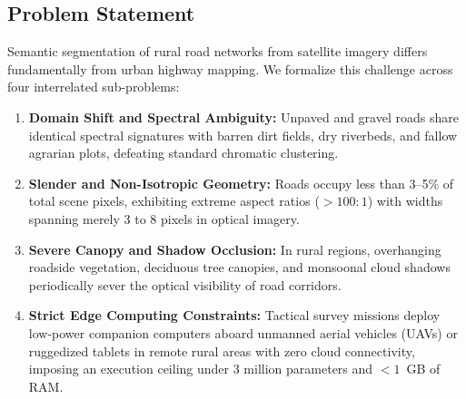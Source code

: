 \documentclass[conference]{IEEEtran}
\begin{document}
\subsection{Problem Statement}
Semantic segmentation of rural road networks from satellite imagery differs fundamentally from urban highway mapping. We formalize this challenge across four interrelated sub-problems:
\begin{enumerate}
    \item \textbf{Domain Shift and Spectral Ambiguity:} Unpaved and gravel roads share identical spectral signatures with barren dirt fields, dry riverbeds, and fallow agrarian plots, defeating standard chromatic clustering.
    \item \textbf{Slender and Non-Isotropic Geometry:} Roads occupy less than 3--5\% of total scene pixels, exhibiting extreme aspect ratios ($>100:1$) with widths spanning merely 3 to 8 pixels in optical imagery.
    \item \textbf{Severe Canopy and Shadow Occlusion:} In rural regions, overhanging roadside vegetation, deciduous tree canopies, and monsoonal cloud shadows periodically sever the optical visibility of road corridors.
    \item \textbf{Strict Edge Computing Constraints:} Tactical survey missions deploy low-power companion computers aboard unmanned aerial vehicles (UAVs) or ruggedized tablets in remote rural areas with zero cloud connectivity, imposing an execution ceiling under 3 million parameters and $<1$~GB of RAM.
\end{enumerate}
\end{document}
